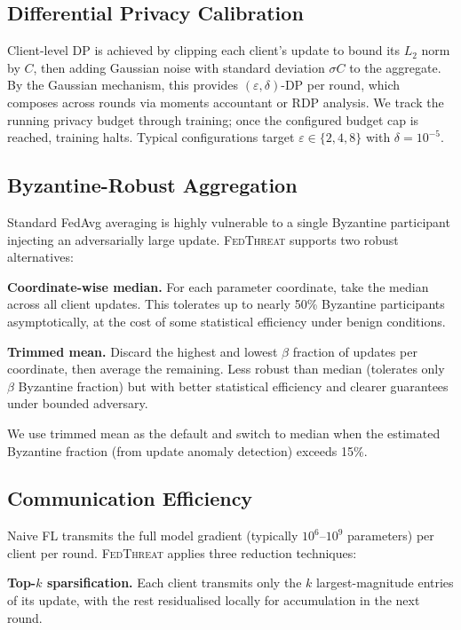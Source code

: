 \documentclass[sigconf,nonacm]{acmart}
\begin{document}
\subsection{Differential Privacy Calibration}

Client-level DP is achieved by clipping each client's update to bound its
$L_2$ norm by $C$, then adding Gaussian noise with standard deviation
$\sigma C$ to the aggregate. By the Gaussian mechanism, this provides
$(\varepsilon, \delta)$-DP per round, which composes across rounds via
moments accountant or RDP analysis. We track the running privacy budget
through training; once the configured budget cap is reached, training
halts. Typical configurations target $\varepsilon \in \{2, 4, 8\}$ with
$\delta = 10^{-5}$.

\subsection{Byzantine-Robust Aggregation}

Standard FedAvg averaging is highly vulnerable to a single Byzantine
participant injecting an adversarially large update. \textsc{FedThreat}
supports two robust alternatives:

\textbf{Coordinate-wise median.} For each parameter coordinate, take the
median across all client updates. This tolerates up to nearly 50\%
Byzantine participants asymptotically, at the cost of some statistical
efficiency under benign conditions.

\textbf{Trimmed mean.} Discard the highest and lowest $\beta$ fraction of
updates per coordinate, then average the remaining. Less robust than
median (tolerates only $\beta$ Byzantine fraction) but with better
statistical efficiency and clearer guarantees under bounded adversary.

We use trimmed mean as the default and switch to median when the estimated
Byzantine fraction (from update anomaly detection) exceeds 15\%.

\subsection{Communication Efficiency}

Naive FL transmits the full model gradient (typically $10^6$--$10^9$
parameters) per client per round. \textsc{FedThreat} applies three
reduction techniques:

\textbf{Top-$k$ sparsification.} Each client transmits only the $k$
largest-magnitude entries of its update, with the rest residualised
locally for accumulation in the next round.
\end{document}
